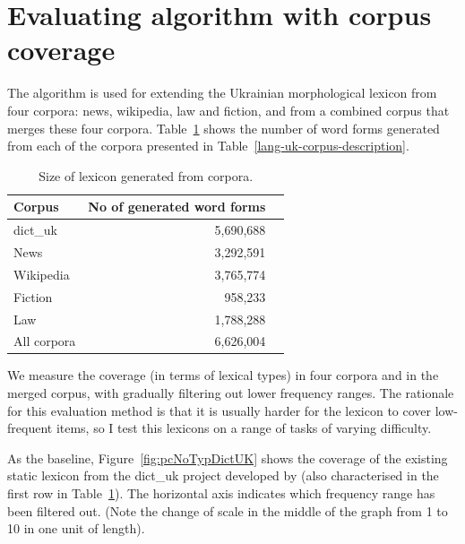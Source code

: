 \documentclass[11pt,a4paper]{article}
\begin{document}
\section{Evaluating algorithm with corpus coverage}
\label{sec:Evaluation}

The algorithm is used for extending the Ukrainian morphological lexicon from four corpora: news, wikipedia, law and fiction, and from a combined corpus that merges these four corpora. Table~\ref{lang-uk-corpus-generation} shows the number of word forms generated from each of the corpora presented in Table~\ref{lang-uk-corpus-description}.

\begin{table}[]
	\begin{center}
		\begin{tabular}{|l|rr|}
			\hline \textbf{Corpus} & \textbf{No of generated word forms} & \textbf{ } 
			\\ \hline
			dict\_uk & 5,690,688  &  \\
			\hline
			News & 3,292,591 &  \\
			Wikipedia & 3,765,774 &  \\
			Fiction & 958,233 &  \\
			Law & 1,788,288 &  \\
			\hline
			All corpora & 6,626,004 &  \\
			\hline
		\end{tabular}
	\end{center}
	\caption{\label{lang-uk-corpus-generation} Size of lexicon generated from corpora. }
\end{table}

We measure the coverage (in terms of lexical types) in four corpora and in the merged corpus, with gradually filtering out lower frequency ranges. The rationale for this evaluation method is that it is usually harder for the lexicon to cover low-frequent items, so I test this lexicons on a range of tasks of varying difficulty.

As the baseline, Figure~\ref{fig:pcNoTypDictUK} shows the coverage of the existing static lexicon from the dict\_uk project developed by \cite{Rysin-Starko-2019} (also characterised in the first row in Table~\ref{lang-uk-corpus-generation}). The horizontal axis indicates which frequency range has been filtered out. (Note the change of scale in the middle of the graph from 1 to 10 in one unit of length).
\end{document}
